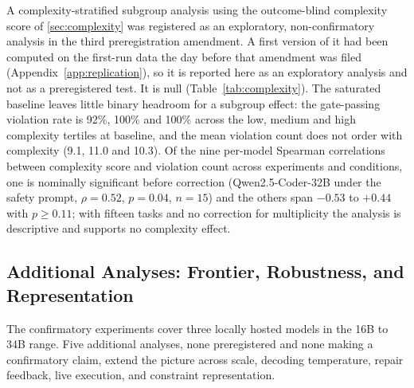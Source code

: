 \documentclass{ieeeaccess}
\begin{document}


A
complexity-stratified subgroup analysis using the outcome-blind complexity score of
\ref{sec:complexity} was registered as an exploratory, non-confirmatory analysis in the
third preregistration amendment. A first version of it had been computed on the first-run
data the day before that amendment was filed (Appendix~\ref{app:replication}), so it is
reported here as an exploratory analysis and not as a preregistered test. It is null
(Table~\ref{tab:complexity}). The saturated baseline leaves little binary headroom for a
subgroup effect: the gate-passing violation rate is 92\%, 100\% and 100\% across the low,
medium and high complexity tertiles at baseline, and the mean violation count does not
order with complexity (9.1, 11.0 and 10.3). Of the nine per-model Spearman correlations
between complexity score and violation count across experiments and conditions, one is
nominally significant before correction (Qwen2.5-Coder-32B under the safety prompt,
$\rho = 0.52$, $p = 0.04$, $n = 15$) and the others span $-0.53$ to $+0.44$ with $p \geq
0.11$; with fifteen tasks and no correction for multiplicity the analysis is descriptive
and supports no complexity effect.



\subsection{Additional Analyses: Frontier, Robustness, and Representation}\label{sec:res-explore}
The confirmatory experiments cover three locally hosted models in the 16B to 34B range.
Five additional analyses, none preregistered and none making a confirmatory claim,
extend the picture across scale, decoding temperature, repair feedback, live execution,
and constraint representation.
\end{document}
